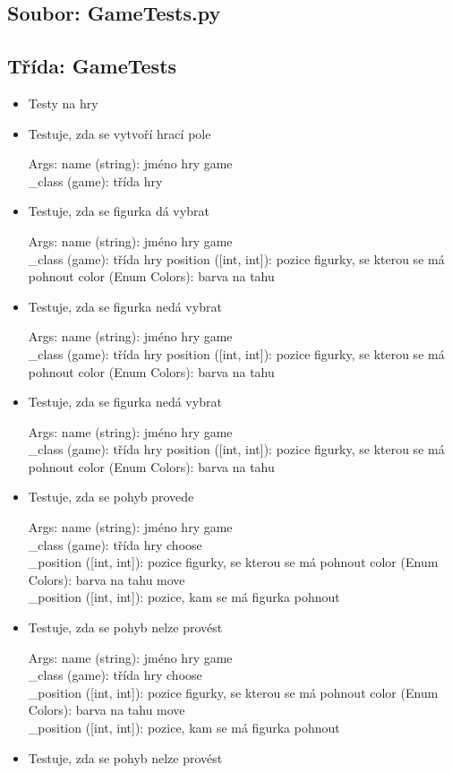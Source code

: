 \documentclass{article}
\begin{document}
\subsection*{Soubor: GameTests.py}
\begin{itemize}
 \subsection*{Třída: GameTests}
\begin{itemize}
\item{Testy na hry
    }
\item{Testuje, zda se vytvoří hrací pole

Args:
    name (string): jméno hry
    game\\_class (game): třída hry}
\item{Testuje, zda se figurka dá vybrat

Args:
    name (string): jméno hry
    game\\_class (game): třída hry
    position ([int, int]): pozice figurky, se kterou se má pohnout
    color (Enum Colors): barva na tahu}
\item{Testuje, zda se figurka nedá vybrat

Args:
    name (string): jméno hry
    game\\_class (game): třída hry
    position ([int, int]): pozice figurky, se kterou se má pohnout
    color (Enum Colors): barva na tahu}
\item{Testuje, zda se figurka nedá vybrat

Args:
    name (string): jméno hry
    game\\_class (game): třída hry
    position ([int, int]): pozice figurky, se kterou se má pohnout
    color (Enum Colors): barva na tahu}
\item{Testuje, zda se pohyb provede

Args:
    name (string): jméno hry
    game\\_class (game): třída hry
    choose\\_position ([int, int]): pozice figurky, se kterou se má pohnout
    color (Enum Colors): barva na tahu
    move\\_position ([int, int]): pozice, kam se má figurka pohnout}
\item{Testuje, zda se pohyb nelze provést

Args:
    name (string): jméno hry
    game\\_class (game): třída hry
    choose\\_position ([int, int]): pozice figurky, se kterou se má pohnout
    color (Enum Colors): barva na tahu
    move\\_position ([int, int]): pozice, kam se má figurka pohnout}
\item{Testuje, zda se pohyb nelze provést

}
\end{itemize}
\end{itemize}
\end{document}
